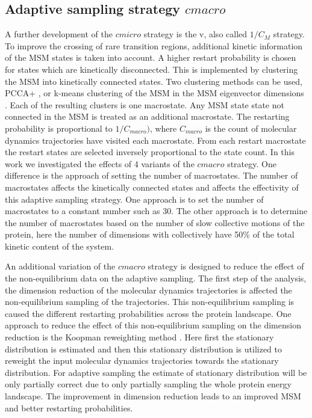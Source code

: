 \subsection{\label{sec:macro}Adaptive sampling strategy $cmacro$} 
A further development of the $cmicro$ strategy is the v, also called $1/C_M$ strategy.
To improve the crossing of rare transition regions, additional kinetic information of the MSM states is taken into account. 
A higher restart probability is chosen for states which are kinetically disconnected. This is implemented by clustering the MSM into kinetically connected states. Two clustering methods can be used, 
PCCA+ \cite{roblitz2013fuzzy}, or k-means clustering of the MSM in the MSM eigenvector dimensions \cite{preto2014fast, doerr2016htmd}. Each of the resulting clusters is one macrostate.
Any MSM state state not connected in the MSM is treated as an additional macrostate. 
The restarting probability is proportional to $1/C_{macro})$, where $C_{macro}$ is the count of molecular dynamics trajectories have visited each macrostate. From each restart macrostate the restart states are selected inversely proportional to the state count.
In this work we investigated the effects of 4 variants of the $cmacro$ strategy. One difference is the approach of setting the number of macrostates. The number of macrostates affects the kinetically connected states and affects the effectivity of this adaptive sampling strategy. 
One approach is to set the number of macrostates to a constant number such as 30. The other approach is to determine the number of macrostates based on the number of
slow collective motions of the protein, here the number of dimensions with collectively have 50\% of the total kinetic content of the system. 

An additional variation of the $cmacro$ strategy is designed to reduce the effect of the non-equilibrium data on the adaptive sampling. The first step of the analysis, the dimension reduction of the molecular dynamics trajectories is affected the non-equilibrium sampling of the trajectories. This non-equilibrium sampling is caused the different restarting probabilities across the protein landscape. One approach to reduce the effect of this non-equilibrium sampling on the dimension reduction is the Koopman reweighting method
\cite{koopmanold, koopman2,koopman3,koopman4, wu2017variational, Nueske2017}. Here first the stationary distribution is estimated and then this stationary distribution is utilized to reweight the input molecular dynamics trajectories towards the stationary distribution. For adaptive sampling the estimate of stationary distribution will be only partially correct due to only partially sampling the whole protein energy landscape. The improvement in dimension reduction leads to an improved MSM and better restarting probabilities. 


